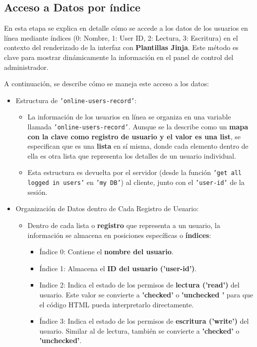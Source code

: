 \documentclass{report}
\begin{document}
\subsection{Acceso a Datos por índice}
En esta etapa se explica en detalle cómo se accede a los datos de los usuarios en línea mediante índices 
(0: Nombre, 1: User ID, 2: Lectura, 3: Escritura) en el contexto del renderizado de la interfaz con \textbf{Plantillas Jinja}. 
Este método es clave para mostrar dinámicamente la información en el panel de control del administrador.

A continuación, se describe cómo se maneja este acceso a los datos:
\begin{itemize}
    \item Estructura de \texttt{'online-users-record'}:
    \begin{itemize}
        \item La información de los usuarios en línea se organiza en una variable llamada \texttt{'online-users-record'}. Aunque se la describe como 
        un \textbf{mapa con la clave como registro de usuario y el valor es una list}, se  especifican que es una \textbf{lista} en sí misma, 
        donde cada elemento dentro de ella es otra lista que representa los detalles de un usuario individual.
        \item Esta estructura es devuelta por el servidor (desde la función \texttt{'get all logged in users'} en \texttt{'my DB'}) al cliente, 
        junto con el \texttt{'user-id'} de la sesión.
    \end{itemize}

    \item Organización de Datos dentro de Cada Registro de Usuario:
    \begin{itemize}
        \item Dentro de cada lista o \textbf{registro} que representa a un usuario, la información se almacena en posiciones 
        específicas o \textbf{índices}:
            \begin{itemize}
                \item Índice 0: Contiene el \textbf{nombre del usuario}.
                \item Índice 1: Almacena el \textbf{ID del usuario ('user-id')}.
                \item Indice 2: Indica el estado de los permisos de \textbf{lectura ('read')} del usuario. Este valor se convierte a 
                \textbf{'checked'} o \textbf{ 'unchecked '} para que el código HTML pueda interpretarlo directamente.
                \item Índice 3: Indica el estado de los permisos de \textbf{escritura ('write')} del usuario. Similar al de lectura, 
                también se convierte a \textbf{'checked'} o \textbf{'unchecked'}.        
        \end{itemize}    
    \end{itemize}


\end{itemize}
\end{document}
